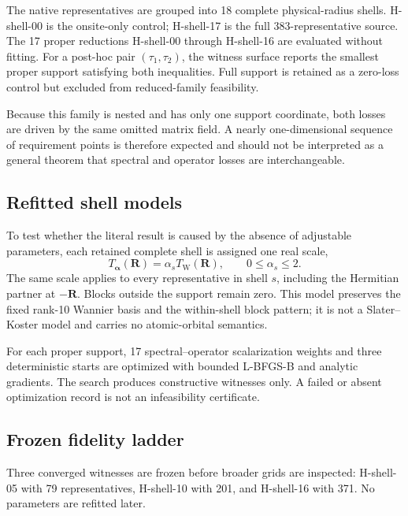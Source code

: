 \documentclass[11pt]{article}
\newcommand{\Rvec}{\mathbf{R}}
\begin{document}
The native representatives are grouped into 18 complete physical-radius shells.
H-shell-00 is the onsite-only control; H-shell-17 is the full 383-representative source.
The 17 proper reductions H-shell-00 through H-shell-16 are evaluated without fitting.
For a post-hoc pair \((\tau_1,\tau_2)\), the witness surface reports the smallest proper
support satisfying both inequalities.  Full support is retained as a zero-loss control
but excluded from reduced-family feasibility.

Because this family is nested and has only one support coordinate, both losses are
driven by the same omitted matrix field.  A nearly one-dimensional sequence of
requirement points is therefore expected and should not be interpreted as a general
theorem that spectral and operator losses are interchangeable.

\subsection{Refitted shell models}

To test whether the literal result is caused by the absence of adjustable parameters,
each retained complete shell is assigned one real scale,
\begin{equation}
  T_{\boldsymbol\alpha}(\Rvec)=\alpha_s T_{\mathrm W}(\Rvec),
  \qquad 0\leq\alpha_s\leq2.
  \label{eq:scaling}
\end{equation}
The same scale applies to every representative in shell \(s\), including the Hermitian
partner at \(-\Rvec\).  Blocks outside the support remain zero.  This model preserves
the fixed rank-10 Wannier basis and the within-shell block pattern; it is not a
Slater--Koster model and carries no atomic-orbital semantics.

For each proper support, 17 spectral--operator scalarization weights and three
deterministic starts are optimized with bounded L-BFGS-B and analytic gradients.  The
search produces constructive witnesses only.  A failed or absent optimization record
is not an infeasibility certificate.

\subsection{Frozen fidelity ladder}

Three converged witnesses are frozen before broader grids are inspected:
H-shell-05 with 79 representatives, H-shell-10 with 201, and H-shell-16 with 371.
No parameters are refitted later.
\end{document}
